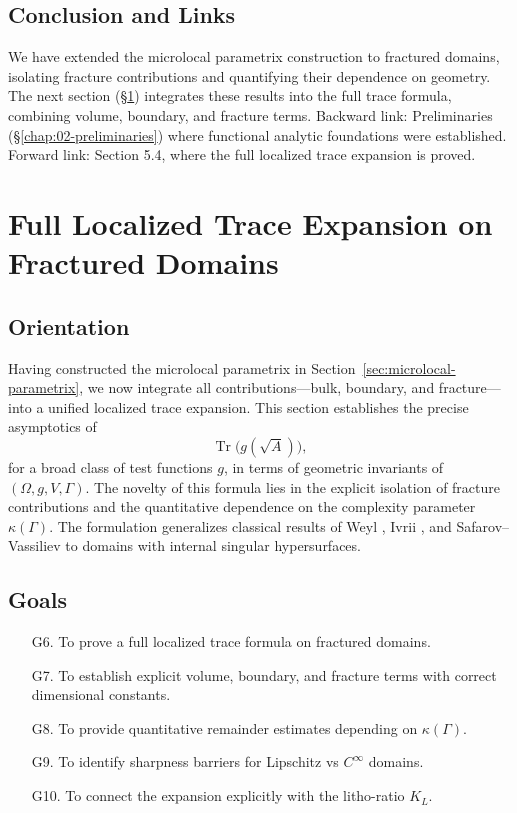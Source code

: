 \subsection*{Conclusion and Links}

We have extended the microlocal parametrix construction to fractured domains, isolating fracture contributions and quantifying their dependence on geometry. 
The next section (\S\ref{sec:full-trace-expansion}) integrates these results into the full trace formula, combining volume, boundary, and fracture terms. 
Backward link: Preliminaries (\S\ref{chap:02-preliminaries}) where functional analytic foundations were established. 
Forward link: Section 5.4, where the full localized trace expansion is proved. 

\section{Full Localized Trace Expansion on Fractured Domains}
\label{sec:full-trace-expansion}

\subsection*{Orientation}

Having constructed the microlocal parametrix in Section~\ref{sec:microlocal-parametrix}, we now integrate all contributions---bulk, boundary, and fracture---into a unified localized trace expansion. 
This section establishes the precise asymptotics of 
\[
\operatorname{Tr}\big(g(\sqrt{A})\big), 
\]
for a broad class of test functions $g$, in terms of geometric invariants of $(\Omega,g,V,\Gamma)$. 
The novelty of this formula lies in the explicit isolation of fracture contributions and the quantitative dependence on the complexity parameter $\kappa(\Gamma)$. 
The formulation generalizes classical results of Weyl \cite{Weyl1912}, Ivrii \cite{Ivrii1980}, and Safarov--Vassiliev \cite{SafarovVassiliev1997} to domains with internal singular hypersurfaces.

\subsection*{Goals}

\begin{itemize}
  \item[G6.] To prove a full localized trace formula on fractured domains. 
  \item[G7.] To establish explicit volume, boundary, and fracture terms with correct dimensional constants. 
  \item[G8.] To provide quantitative remainder estimates depending on $\kappa(\Gamma)$. 
  \item[G9.] To identify sharpness barriers for Lipschitz vs $C^\infty$ domains. 
  \item[G10.] To connect the expansion explicitly with the litho-ratio $K_L$. 
\end{itemize}

